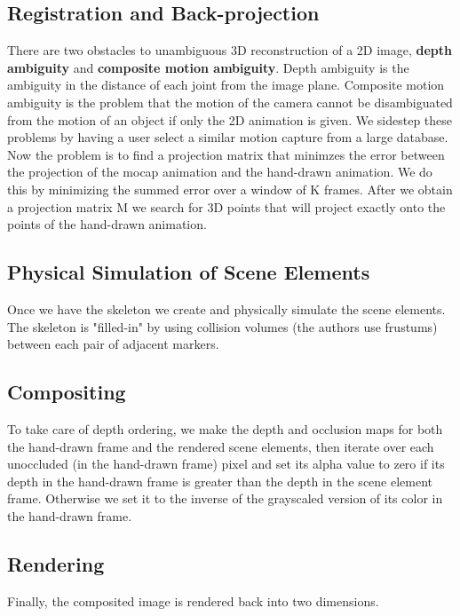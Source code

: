 \documentclass[a4paper,9pt]{article}
\begin{document}
\subsection{Registration and Back-projection}

There are two obstacles to unambiguous 3D reconstruction of a 2D image, \textbf{depth ambiguity} and \textbf{composite motion ambiguity}. Depth ambiguity is the ambiguity in the distance of each joint from the image plane. Composite motion ambiguity is the problem that the motion of the camera cannot be disambiguated from the motion of an object if only the 2D animation is given. We sidestep these problems by having a user select a similar motion capture from a large database. Now the problem is to find a projection matrix that minimzes the error between the projection of the mocap animation and the hand-drawn animation. We do this by minimizing the summed error over a window of K frames. After we obtain a projection matrix M we search for 3D points that will project exactly onto the points of the hand-drawn animation.

\subsection{Physical Simulation of Scene Elements}

Once we have the skeleton we create and physically simulate the scene elements. The skeleton is "filled-in" by using collision volumes (the authors use frustums) between each pair of adjacent markers.

\subsection{Compositing}

To take care of depth ordering, we make the depth and occlusion maps for both the hand-drawn frame and the rendered scene elements, then iterate over each unoccluded (in the hand-drawn frame) pixel and set its alpha value to zero if its depth in the hand-drawn frame is greater than the depth in the scene element frame. Otherwise we set it to the inverse of the grayscaled version of its color in the hand-drawn frame.

\subsection{Rendering}

Finally, the composited image is rendered back into two dimensions.
\end{document}

